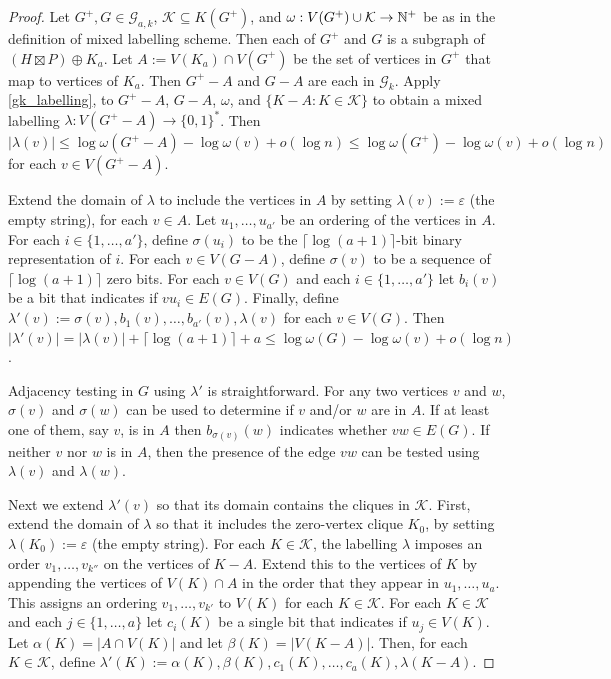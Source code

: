 \documentclass{patmorin}
\renewcommand{\le}{\leqslant}
\begin{document}
  \begin{proof}
    Let $G^+,G\in\mathcal{G}_{a,k}$, $\mathcal{K}\subseteq K(G^+)$, and $\omega:V(G^+)\cup\mathcal{K}\to\mathbb{N}^+$ be as in the definition of mixed labelling scheme.  Then each of $G^+$ and $G$ is a subgraph of $(H\boxtimes P)\oplus K_a$.  Let $A:=V(K_a)\cap V(G^+)$ be the set of vertices in $G^+$ that map to vertices of $K_a$.  Then $G^+-A$ and $G-A$ are each in $\mathcal{G}_k$.  Apply \cref{gk_labelling}, to $G^+-A$, $G-A$, $\omega$, and $\{K-A:K\in\mathcal{K}\}$ to obtain a mixed labelling $\lambda:V(G^+-A)\to\{0,1\}^*$.  Then $|\lambda(v)|\le \log\omega(G^+-A) -\log\omega(v)+o(\log n)\le \log\omega(G^+)-\log\omega(v)+o(\log n)$ for each $v\in V(G^+-A)$.

    Extend the domain of $\lambda$ to include the vertices in $A$ by setting $\lambda(v):=\varepsilon$ (the empty string), for each $v\in A$.  Let $u_1,\ldots,u_{a'}$ be an ordering of the vertices in $A$. For each $i\in\{1,\ldots,a'\}$, define $\sigma(u_i)$ to be the $\lceil\log(a+1)\rceil$-bit binary representation of $i$.  For each $v\in V(G-A)$, define $\sigma(v)$ to be a sequence of $\lceil\log(a+1)\rceil$ zero bits.  For each $v\in V(G)$ and each $i\in\{1,\ldots,a'\}$ let $b_i(v)$ be a bit that indicates if $vu_i\in E(G)$.  Finally, define $\lambda'(v):=\sigma(v),b_1(v),\ldots,b_{a'}(v),\lambda(v)$ for each $v\in V(G)$.  Then $|\lambda'(v)|=|\lambda(v)|+\lceil\log (a+1)\rceil+a \le \log\omega(G)-\log\omega(v)+o(\log n)$.

    Adjacency testing in $G$ using $\lambda'$ is straightforward. For any two vertices $v$ and $w$, $\sigma(v)$ and $\sigma(w)$ can be used to determine if $v$ and/or $w$ are in $A$.  If at least one of them, say $v$, is in $A$ then $b_{\sigma(v)}(w)$ indicates whether $vw\in E(G)$.  If neither $v$ nor $w$ is in $A$, then the presence of the edge $vw$ can be tested using $\lambda(v)$ and $\lambda(w)$.

    Next we extend $\lambda'(v)$ so that its domain contains the cliques in $\mathcal{K}$.  First, extend the domain of $\lambda$ so that it includes the zero-vertex clique $K_0$, by setting $\lambda(K_0):=\varepsilon$ (the empty string).
    For each $K\in\mathcal{K}$, the labelling $\lambda$ imposes an order $v_1,\ldots,v_{k''}$ on the vertices of $K-A$. Extend this to the vertices of $K$ by appending the vertices of $V(K)\cap A$ in the order that they appear in $u_1,\ldots,u_{a}$. This assigns an ordering $v_1,\ldots,v_{k'}$ to $V(K)$ for each $K\in\mathcal{K}$.
    For each $K\in\mathcal{K}$ and each $j\in\{1,\ldots,a\}$ let $c_i(K)$ be a single bit that indicates if $u_j\in V(K)$.  Let $\alpha(K)=|A\cap V(K)|$ and let $\beta(K)=|V(K-A)|$.  Then, for each $K\in\mathcal{K}$, define $\lambda'(K):=\alpha(K),\beta(K),c_1(K),\ldots,c_{a}(K),\lambda(K-A)$.


\end{proof}
\end{document}
